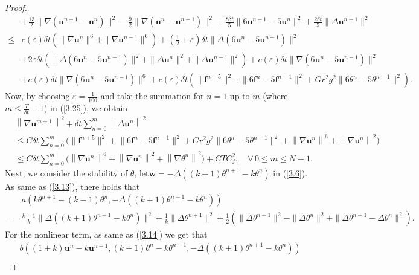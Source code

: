 \documentclass[10pt]{article}
\begin{document}
\begin{proof}
\begin{align}
			&   + \frac{13}{2} \|\nabla(\bm{u}^{n+1} - \bm{u}^n)\|^2 - \frac{9}{2} \|\nabla(\bm{u}^n - \bm{u}^{n-1})\|^2 +\frac{8\delta t}{5}\|6\bm{u}^{n+1}-5\bm{u}^n\|^2+\frac{2\delta t}{5}\|\Delta\bm{u}^{n+1}\|^2\nonumber\\
			\leq & c(\varepsilon)\delta t(\|\nabla\bm{u}^n\|^6+\|\nabla\bm{u}^{n-1}\|^6)+(\frac{1}{2}+\varepsilon)\delta t\|\Delta(6\bm{u}^{n}-5\bm{u}^{n-1})\|^2\nonumber\\
			&  +2\varepsilon\delta t(\|\Delta(6\bm{u}^{n}-5\bm{u}^{n-1})\|^2+\|\Delta\bm{u}^n\|^2+\|\Delta\bm{u}^{n-1}\|^2)+c(\varepsilon) \delta t{ \|\nabla(6\bm{u}^n-5\bm{u}^{n-1})\|^2}\nonumber\\
			&  +c(\varepsilon) \delta t\|\nabla(6\bm{u}^n-5\bm{u}^{n-1})\|^6+c(\varepsilon)\delta t(\|\bm{f}^{n+5}\|^2+\|6\bm{f}^n-5\bm{f}^{n-1}\|^2+Gr^2g^2\|6\theta^n-5\theta^{n-1}\|^2).
		\end{align}
		Now, by choosing \( \varepsilon = \frac{1}{100} \) and take the summation for $n=1$ up to $m$ (where $m\leq\frac{T}{\delta t}-1$) in (\ref{3.25}), we obtain
		{ 
		\begin{align}\label{3.26}
			&\left\| \nabla \bm{u}^{m+1} \right\|^2 + \delta t \sum_{n=0}^m \left\| \Delta \bm{u}^n \right\|^2\nonumber\\
			&\leq C \delta t \sum_{n=0}^{m} \Big( \|\bm{f}^{n+5}\|^2 + \big\|6\bm{f}^n - 5\bm{f}^{n-1}\big\|^2 + Gr^2 g^2 \big\|6\theta^n - 5\theta^{n-1}\big\|^2+\left\| \nabla \bm{u}^n \right\|^6 +\left\| \nabla \bm{u}^n \right\|^2\Big) \nonumber \\
			&\leq C \delta t \sum_{n=0}^{m} \Big(\left\| \nabla \bm{u}^n \right\|^6+\left\| \nabla \bm{u}^n \right\|^2 +\left\| \nabla \theta^n \right\|^2\Big)
			+ C T C_f^2, \quad \forall\, 0 \le m \leq N-1.
		\end{align}
		}
		Next, we consider the stability of $\theta$, let$\bm{w}=-\Delta((k+1)\theta^{n+1}-k\theta^n)$ in (\ref{3.6}). As same as  (\ref{3.13}), there holds that
		\begin{align}\label{3.27}
			& a(k\theta^{n+1}-(k-1)\theta^n,-\Delta((k+1)\theta^{n+1}-k\theta^n))\\
			= &\frac{k-1}{k}\|\Delta((k+1)\theta^{n+1}-k\theta^n)\|^2+\frac{1}{k}\|\Delta\theta^{n+1}\|^2+\frac{1}{2}(\|\Delta\theta^{n+1}\|^2-\|\Delta\theta^n\|^2+\|\Delta\theta^{n+1}-\Delta\theta^n\|^2).\nonumber
		\end{align}
		For the nonlinear term, as same as  (\ref{3.14}) we get that
		{ 
		\begin{align}\label{3.28}
			&b((1+k)\bm{u}^n-k\bm{u}^{n-1},(k+1)\theta^{n} - k\theta^{n-1},-\Delta((k+1)\theta^{n+1}-k\theta^n))\nonumber\\

\end{align}}
\end{proof}
\end{document}
